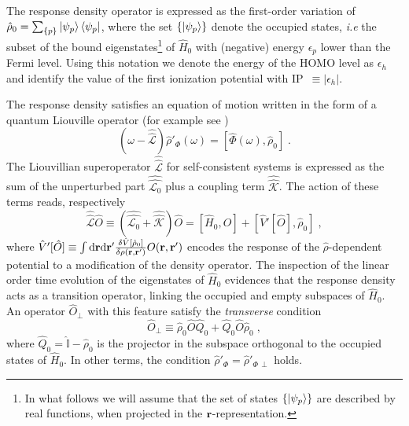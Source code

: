 \documentclass[reprint,aps,prb]{revtex4-1}
\newcommand{\dd}{{\rm d}}
\renewcommand{\r}{{\bf r}}
\newcommand{\eps}{\epsilon}
\newcommand{\be}{\begin{equation}}
\newcommand{\ee}{\end{equation}}
\newcommand{\lb}{\label}
\newcommand{\op}[1]{\hat {#1}}
\newcommand{\sop}[1]{\op{\op {#1}}}
\newcommand{\commutator}[2]{\left[ {#1} , {#2} \right]}
\newcommand{\dmnot}{\op{\rho}_0}
\newcommand{\dm}{\op{\rho}}
\newcommand{\hnot}{\op{H}_0}
\newcommand{\Liouv}{\sop{\mathcal L}}
\newcommand{\Liouvnot}{\sop{\mathcal L_0}}
\newcommand{\coupl}{\sop{\mathcal K}}
\newcommand{\identity}{\op{\mathbb I}}
\begin{document}
The response density operator is expressed as the first-order variation of $\dmnot=\sum_{\{p\}} \ket{\psi_p} \bra{\psi_p}$, where the set $\{\ket{\psi_p}\}$ denote the 
occupied states, \emph{i.e} the subset of the bound eigenstates\footnote{In what follows we will assume that the set of states $\{\ket{\psi_p}\}$ are described by real 
functions, when projected in the $\r$-representation.} of $\hnot$ with (negative) energy $\eps_p$ lower than the Fermi level. Using this notation we denote the energy of the HOMO level 
as $\eps_h$ and identify the value of the first ionization potential with IP~$\equiv|\eps_h|$. 

The response density satisfies an equation of motion written in the form of a quantum Liouville operator (for example see \cite{baroni2008})
\be\lb{LiouvillianRhopomegaDef1}
\left(\omega - \Liouv\right) \dm'_\Phi(\omega) =  \commutator{\op\Phi(\omega)}{\dmnot} \;.
\ee
The Liouvillian superoperator $\Liouv$ for self-consistent systems is expressed as the sum of the unperturbed part $\Liouvnot$ plus a coupling term $ \coupl$. The action of these 
terms reads, respectively
\be\lb{LiouZeroDef1}
\Liouv \op O \equiv \left(\Liouvnot + \coupl \right) \op O = \commutator{\hnot}{\op O} +\commutator{\op V'[\op O]}{\dmnot}  \;,
\ee
where $\op V'[\op O] \equiv \int \dd \r \dd \r'\frac{\delta \op V[\dmnot]}{\delta \rho(\r,\r')} O(\r,\r')$ encodes the response of the $\dm$-dependent potential to a modification of the density operator.
The inspection of the linear order time evolution of the eigenstates of $\hnot$ evidences that the response density acts as a transition 
operator, linking the occupied and empty subspaces of $\hnot$.
An operator $\op O_\perp$ with this feature satisfy the \emph{transverse} condition  
\be\lb{RhopTransverseDef1}
\op O_\perp \equiv 
\dmnot\op O \op Q_0 + \op Q_0 \op O\dmnot \;,
\ee
where $\op Q_0=\identity-\dmnot$ is the projector in the subspace orthogonal to the occupied states of $\hnot$. 
In other terms, the condition $\dm'_\Phi = \dm'_{\Phi\,\perp}$ holds.
\end{document}

